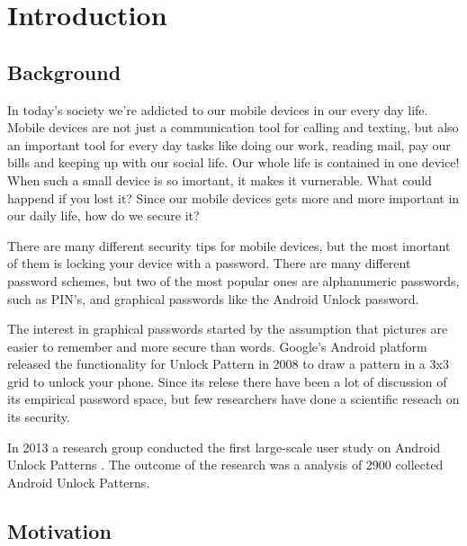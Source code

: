 \chapter{Introduction}

\section{Background}
    
  In today's society we're addicted to our mobile devices in our every day life. 
  Mobile devices are not just a communication tool for calling and texting, 
  but also an important tool for every day tasks like doing our work, reading mail, pay our bills and keeping up 
  with our social life. Our whole life is contained in one device!
  When such a small device is so imortant, it makes it vurnerable. What could happend if you lost it?
  Since our mobile devices gets more and more important in our daily life, how do we secure it?

  There are many different security tips for mobile devices, but the most imortant of them is locking your device
  with a password. There are many different password schemes, but two of the most popular ones are alphanumeric 
  passwords, such as PIN's, and graphical passwords like the Android Unlock password. 

  The interest in graphical passwords started by the assumption that pictures are easier to remember and more 
  secure than words. Google's Android platform released the functionality for Unlock Pattern in 2008 to draw a 
  pattern in a 3x3 grid to unlock your phone. Since its relese there have been a lot of discussion 
  of its empirical password space, but few researchers have done a scientific reseach on its security. 

  In 2013 a research group conducted the first large-scale user study on Android Unlock Patterns \cite{Uellenbeck}. 
  The outcome of the research was a analysis of 2900 collected Android Unlock Patterns.



\section{Motivation}

    

